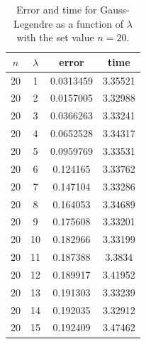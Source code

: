 \documentclass{article}
\begin{document}
\begin{table}[ht]
    \centering
    \caption{Error and time for Gauss-Legendre as a function of $\lambda$ with the set value $n = 20$. }
    \vspace{2mm}
    \label{tab:lambda}
    \begin{tabular}{|c|c|c|c|}
        \hline
        $n$ & $\lambda$ & error & time \\
        \hline \hline
        20 & 1 & 0.0313459 & 3.35521 \\
        20 & 2 & 0.0157005 & 3.32988 \\
        20 & 3 & 0.0366263 & 3.33241 \\
        20 & 4 & 0.0652528 & 3.34317 \\
        20 & 5 & 0.0959769 & 3.33531 \\
        20 & 6 & 0.124165 & 3.33762 \\
        20 & 7 & 0.147104 & 3.33286 \\
        20 & 8 & 0.164053 & 3.34689 \\
        20 & 9 & 0.175608 & 3.33201 \\
        20 & 10 & 0.182966 & 3.33199 \\
        20 & 11 & 0.187388 & 3.3834 \\
        20 & 12 & 0.189917 & 3.41952 \\
        20 & 13 & 0.191303 & 3.33239 \\
        20 & 14 & 0.192035 & 3.32912 \\
        20 & 15 & 0.192409 & 3.47462 \\
        \hline
      \end{tabular} \\
      \hspace{0pt}\\
  \end{table}
\end{document}
